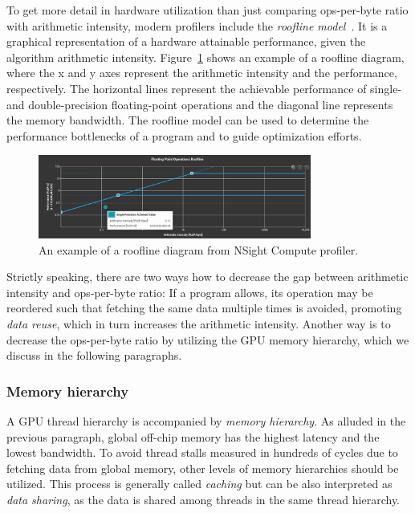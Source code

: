 To get more detail in hardware utilization than just comparing ops-per-byte ratio with arithmetic intensity, modern profilers include the \emph{roofline model}~\cite{williams2009roofline}. It is a graphical representation of a hardware attainable performance, given the algorithm arithmetic intensity. Figure~\ref{fig:roof} shows an example of a roofline diagram, where the x and y axes represent the arithmetic intensity and the performance, respectively. The horizontal lines represent the achievable performance of single- and double-precision floating-point operations and the diagonal line represents the memory bandwidth. The roofline model can be used to determine the performance bottlenecks of a program and to guide optimization efforts.

\begin{figure}
    \centering
    \includegraphics[width=0.8\textwidth]{img/roofline.png}
    \caption{An example of a roofline diagram from NSight Compute profiler.}
    \label{fig:roof}
\end{figure}

Strictly speaking, there are two ways how to decrease the gap between arithmetic intensity and ops-per-byte ratio: If a program allows, its operation may be reordered such that fetching the same data multiple times is avoided, promoting \emph{data reuse}, which in turn increases the arithmetic intensity. Another way is to decrease the ops-per-byte ratio by utilizing the GPU memory hierarchy, which we discuss in the following paragraphs.

\subsubsection{Memory hierarchy}
\label{sec:memory_hier}

A GPU thread hierarchy is accompanied by \emph{memory hierarchy}. As alluded in the previous paragraph, global off-chip memory has the highest latency and the lowest bandwidth. To avoid thread stalls measured in hundreds of cycles due to fetching data from global memory, other levels of memory hierarchies should be utilized. This process is generally called \emph{caching} but can be also interpreted as \emph{data sharing}, as the data is shared among threads in the same thread hierarchy.


